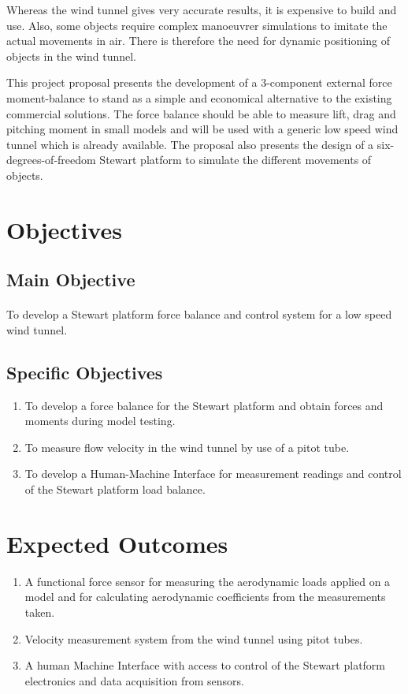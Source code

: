 Whereas the wind tunnel gives very accurate results, it is expensive to build and use. Also, some objects require complex manoeuvrer simulations to imitate the actual movements in air. There is therefore the need for dynamic positioning of objects in the wind tunnel.

This project proposal presents the development of a 3-component external force moment-balance to stand as a simple and economical alternative to the existing commercial solutions. The force balance should be able to measure lift, drag and pitching moment in small models and will be used with a generic low speed wind tunnel which is already available. The proposal also presents the design of a six-degrees-of-freedom Stewart platform to simulate the different movements of objects.
\section{Objectives}
\subsection{Main Objective}
\paragraph{} To develop a Stewart platform force balance and control system for a low speed wind tunnel. 
\subsection{Specific Objectives}
\begin{enumerate}
\item To develop a force balance for the Stewart platform and obtain forces and moments during model testing.
\item To measure flow velocity in the wind tunnel by use of a pitot tube.
\item To develop a Human-Machine Interface for measurement readings and control of the Stewart platform load balance.
\end{enumerate}
\section{Expected Outcomes}
\begin{enumerate}
\item A functional force sensor for measuring the aerodynamic loads applied on a model
and for calculating aerodynamic coefficients from the measurements taken.
\item Velocity measurement system from the wind tunnel using pitot tubes.
\item A human Machine Interface with access to control of the Stewart platform electronics
and data acquisition from sensors.
\end{enumerate}
